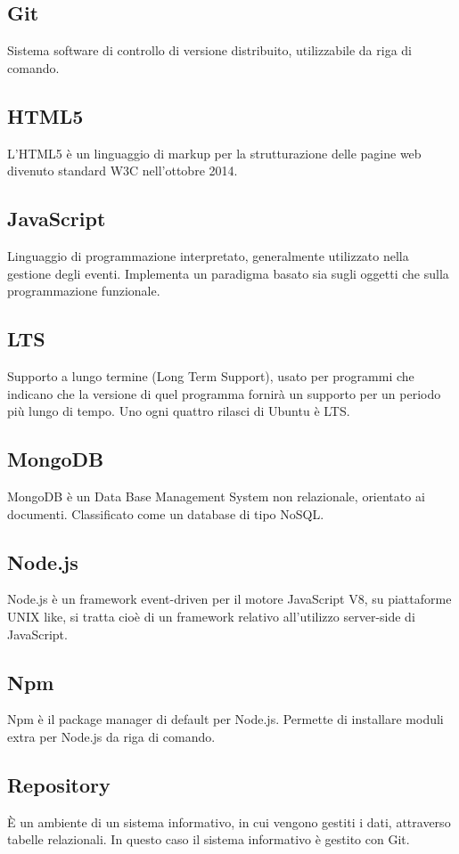 \documentclass[a4paper, titlepage]{article}
\begin{document}
	\subsection{Git}
	Sistema software di controllo di versione distribuito, utilizzabile da riga di comando.
	
	\subsection{HTML5}
	L’HTML5 è un linguaggio di markup per la strutturazione delle pagine web divenuto standard W3C nell’ottobre 2014.
	
	\subsection{JavaScript}
	Linguaggio di programmazione interpretato, generalmente utilizzato nella gestione degli eventi.
	Implementa un paradigma basato sia sugli oggetti che sulla programmazione funzionale.
	
	\subsection{LTS}
	 Supporto a lungo termine (Long Term Support), usato per programmi che indicano che la versione di quel programma fornirà un supporto per un periodo più lungo di tempo. Uno ogni quattro rilasci di Ubuntu è LTS.
	
	\subsection{MongoDB}
	MongoDB è un Data Base Management System non relazionale, orientato ai documenti. Classificato come un database di tipo NoSQL.
	
	\subsection{Node.js}
	Node.js è un framework event-driven per il motore JavaScript V8, su piattaforme UNIX like, si tratta cioè di un framework relativo all'utilizzo server-side di JavaScript.
	
	\subsection{Npm}
	Npm è il package manager di default per Node.js. Permette di installare moduli extra per Node.js da riga di comando.
	
	\subsection{Repository}
	È un ambiente di un sistema informativo, in cui vengono gestiti i dati, attraverso tabelle relazionali. In questo caso il sistema informativo è gestito con Git.
	
\end{document}
